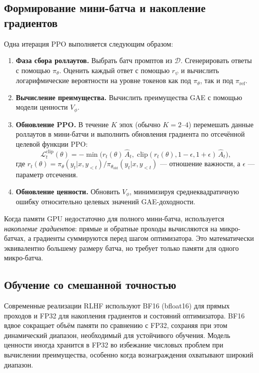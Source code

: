 \subsection{Формирование мини-батча и накопление градиентов}
\label{sec:minibatch}

Одна итерация PPO выполняется следующим образом:
\begin{enumerate}
  \item \textbf{Фаза сбора роллаутов.} Выбрать батч промптов из $\mathcal{D}$. Сгенерировать ответы с помощью $\pi_\theta$. Оценить каждый ответ с помощью $r_\psi$ и вычислить логарифмические вероятности на уровне токенов как под $\pi_\theta$, так и под $\pi_{\mathrm{ref}}$.
  \item \textbf{Вычисление преимущества.} Вычислить преимущества GAE с помощью модели ценности $V_\phi$.
  \item \textbf{Обновление PPO.} В течение $K$ эпох (обычно $K = 2$--$4$) перемешать данные роллаутов в мини-батчи и выполнить обновления градиента по отсечённой целевой функции PPO:
  \begin{equation}
  \label{eq:ppo-clip-lm}
  \mathcal{L}^{\mathrm{clip}}_t(\theta) = -\min\!\bigl(r_t(\theta)\,\hat{A}_t,\; \mathrm{clip}(r_t(\theta), 1{-}\epsilon, 1{+}\epsilon)\,\hat{A}_t\bigr),
  \end{equation}
  где $r_t(\theta) = \pi_\theta(y_t|x,y_{<t}) / \pi_{\theta_{\mathrm{old}}}(y_t|x,y_{<t})$ --- отношение важности, а $\epsilon$ --- параметр отсечения.
  \item \textbf{Обновление ценности.} Обновить $V_\phi$, минимизируя среднеквадратичную ошибку относительно целевых значений GAE-доходности.
\end{enumerate}

Когда памяти GPU недостаточно для полного мини-батча, используется \emph{накопление градиентов}: прямые и обратные проходы вычисляются на микро-батчах, а градиенты суммируются перед шагом оптимизатора. Это математически эквивалентно большему размеру батча, но требует только памяти для одного микро-батча.

\subsection{Обучение со смешанной точностью}

Современные реализации RLHF используют BF16 (bfloat16) для прямых проходов и FP32 для накопления градиентов и состояний оптимизатора. BF16 вдвое сокращает объём памяти по сравнению с FP32, сохраняя при этом динамический диапазон, необходимый для устойчивого обучения. Модель ценности иногда хранится в FP32 во избежание числовых проблем при вычислении преимущества, особенно когда вознаграждения охватывают широкий диапазон.

